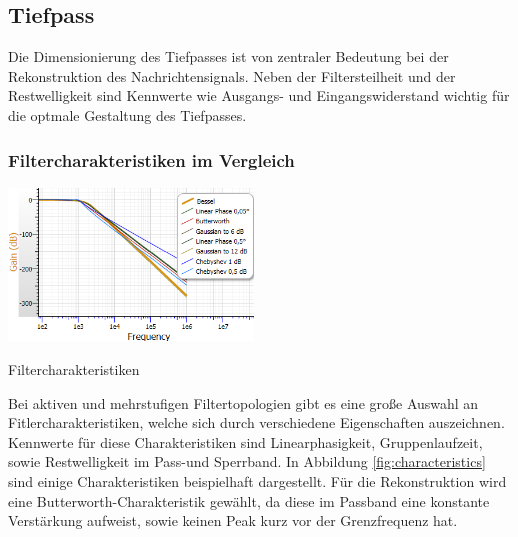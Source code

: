 \newpage
\subsection{Tiefpass}
Die Dimensionierung des Tiefpasses ist von zentraler Bedeutung bei der Rekonstruktion des Nachrichtensignals. Neben der Filtersteilheit und der Restwelligkeit sind Kennwerte wie Ausgangs- und Eingangswiderstand wichtig für die optmale Gestaltung des Tiefpasses.
\subsubsection{Filtercharakteristiken im Vergleich} 
\begin{floatingfigure}[r]{7cm}
	\includegraphics[width=6.5cm]{gfx/characteristics.png}
	\caption{Filtercharakteristiken}
\label{fig:characteristics}
\end{floatingfigure}
\noindent
Bei aktiven und mehrstufigen Filtertopologien gibt es eine große Auswahl an Fitlercharakteristiken, welche sich durch verschiedene Eigenschaften auszeichnen. Kennwerte für diese Charakteristiken sind Linearphasigkeit, Gruppenlaufzeit, sowie Restwelligkeit im Pass-und Sperrband. In Abbildung \ref{fig:characteristics} sind einige Charakteristiken beispielhaft dargestellt. Für die Rekonstruktion wird eine Butterworth-Charakteristik gewählt, da diese im Passband eine konstante Verstärkung aufweist, sowie keinen Peak kurz vor der Grenzfrequenz hat.\\

